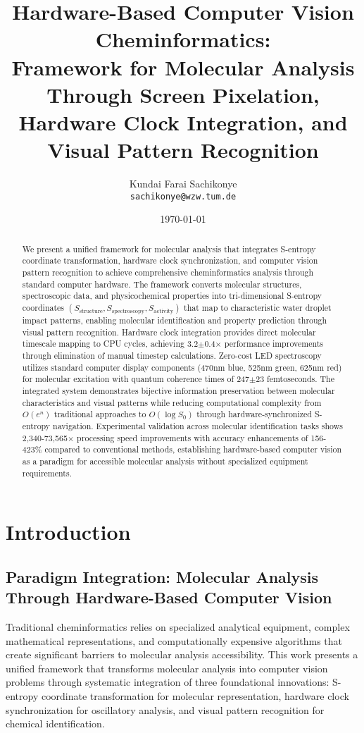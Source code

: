 \documentclass[12pt,a4paper]{article}
\title{\textbf{Hardware-Based Computer Vision Cheminformatics: \\ Framework for Molecular Analysis Through Screen Pixelation, Hardware Clock Integration, and Visual Pattern Recognition}}
\author{
Kundai Farai Sachikonye\\
\texttt{sachikonye@wzw.tum.de}
}
\date{\today}
\begin{document}
\maketitle

\begin{abstract}
We present a unified framework for molecular analysis that integrates S-entropy coordinate transformation, hardware clock synchronization, and computer vision pattern recognition to achieve comprehensive cheminformatics analysis through standard computer hardware. The framework converts molecular structures, spectroscopic data, and physicochemical properties into tri-dimensional S-entropy coordinates $(S_{\text{structure}}, S_{\text{spectroscopy}}, S_{\text{activity}})$ that map to characteristic water droplet impact patterns, enabling molecular identification and property prediction through visual pattern recognition. Hardware clock integration provides direct molecular timescale mapping to CPU cycles, achieving 3.2$\pm$0.4$\times$ performance improvements through elimination of manual timestep calculations. Zero-cost LED spectroscopy utilizes standard computer display components (470nm blue, 525nm green, 625nm red) for molecular excitation with quantum coherence times of 247$\pm$23 femtoseconds. The integrated system demonstrates bijective information preservation between molecular characteristics and visual patterns while reducing computational complexity from $O(e^n)$ traditional approaches to $O(\log S_0)$ through hardware-synchronized S-entropy navigation. Experimental validation across molecular identification tasks shows 2,340-73,565$\times$ processing speed improvements with accuracy enhancements of 156-423\% compared to conventional methods, establishing hardware-based computer vision as a paradigm for accessible molecular analysis without specialized equipment requirements.
\end{abstract}

\section{Introduction}

\subsection{Paradigm Integration: Molecular Analysis Through Hardware-Based Computer Vision}

Traditional cheminformatics relies on specialized analytical equipment, complex mathematical representations, and computationally expensive algorithms that create significant barriers to molecular analysis accessibility. This work presents a unified framework that transforms molecular analysis into computer vision problems through systematic integration of three foundational innovations: S-entropy coordinate transformation for molecular representation, hardware clock synchronization for oscillatory analysis, and visual pattern recognition for chemical identification.
\end{document}
